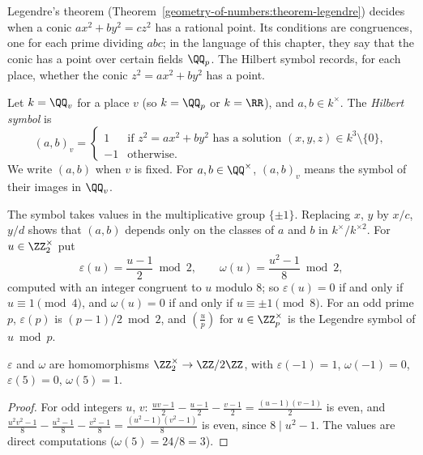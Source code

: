 Legendre's theorem (Theorem~\ref{geometry-of-numbers:theorem-legendre}) decides when a conic $ax^2 + by^2 = cz^2$ has a rational point. Its conditions are congruences, one for each prime dividing $abc$;
in the language of this chapter, they say that the conic has a point over certain fields $\QQ_p$. The Hilbert symbol records, for each place, whether the conic $z^2 = ax^2 + by^2$ has a point.

\begin{definition}\label{p-adic-numbers:definition-hilbert-symbol}
Let $k = \QQ_v$ for a place $v$ (so $k = \QQ_p$ or $k = \RR$), and $a, b \in k^\times$. The \emph{Hilbert symbol} is
\[
(a, b)_v = \begin{cases}1 & \text{if } z^2 = ax^2 + by^2 \text{ has a solution } (x, y, z) \in k^3 \setminus \{0\},\\ -1 & \text{otherwise.}\end{cases}
\]
We write $(a, b)$ when $v$ is fixed. For $a, b \in \QQ^\times$, $(a, b)_v$ means the symbol of their images in $\QQ_v$.
\end{definition}

\begin{notation}\label{p-adic-numbers:notation-hilbert}
The symbol takes values in the multiplicative group $\{\pm1\}$. Replacing $x$, $y$ by $x/c$, $y/d$ shows that $(a, b)$ depends only on the classes of $a$ and $b$ in $k^\times/k^{\times2}$. For $u \in \ZZ_2^\times$ put
\[
\varepsilon(u) = \frac{u - 1}{2} \bmod 2, \qquad \omega(u) = \frac{u^2 - 1}{8} \bmod 2,
\]
computed with an integer congruent to $u$ modulo $8$; so $\varepsilon(u) = 0$ if and only if $u \equiv 1 \pmod 4$, and $\omega(u) = 0$ if and only if $u \equiv \pm1 \pmod 8$. For an odd prime $p$, $\varepsilon(p)$ is
$(p - 1)/2 \bmod 2$, and $(\frac up)$ for $u \in \ZZ_p^\times$ is the Legendre symbol of $u \bmod p$.
\end{notation}

\begin{lemma}\label{p-adic-numbers:lemma-epsilon-omega}
$\varepsilon$ and $\omega$ are homomorphisms $\ZZ_2^\times \to \ZZ/2\ZZ$, with $\varepsilon(-1) = 1$, $\omega(-1) = 0$, $\varepsilon(5) = 0$, $\omega(5) = 1$.
\end{lemma}

\begin{proof}
For odd integers $u$, $v$: $\frac{uv - 1}{2} - \frac{u - 1}{2} - \frac{v - 1}{2} = \frac{(u - 1)(v - 1)}{2}$ is even, and $\frac{u^2v^2 - 1}{8} - \frac{u^2 - 1}{8} - \frac{v^2 - 1}{8} = \frac{(u^2 - 1)(v^2 - 1)}{8}$ is even,
since $8 \mid u^2 - 1$. The values are direct computations ($\omega(5) = 24/8 = 3$).
\end{proof}

